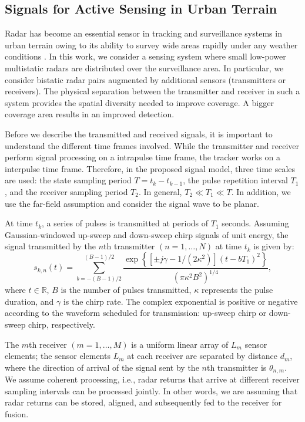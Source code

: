 \documentclass[times]{asjcauth}
\begin{document}
\subsection{Signals for Active Sensing in Urban Terrain}
\label{secsensor}

Radar has become an essential sensor in tracking and surveillance systems in urban terrain owing to its ability to survey wide areas rapidly under any weather conditions \cite{chavali}. In this work, we consider a sensing system where small low-power multistatic radars are distributed over the surveillance area. In particular, we consider bistatic radar pairs augmented by additional sensors (transmitters or receivers). The physical separation between the transmitter and receiver in such a system provides the spatial diversity needed to improve coverage. A bigger coverage area results in an improved detection.

Before we describe the transmitted and received signals, it is important to understand the different time frames involved. While the transmitter and receiver perform signal processing on a intrapulse time frame, the tracker works on a interpulse time frame. Therefore, in the proposed signal model, three time scales are used:  the state sampling period $T = t_{k}-t_{k-1}$, the pulse repetition interval $T_{1}$, and the receiver sampling period $T_{2}$. In general, $T_{2}\ll T_{1}\ll T$. In addition,  we use the far-field assumption and consider the signal wave to be planar.

At time $t_{k}$, a series of pulses is transmitted at periods of $T_{1}$ seconds. Assuming Gaussian-windowed up-sweep and down-sweep chirp signals of unit energy, the signal transmitted by the $n$th transmitter $(n = 1,\ldots,N)$ at time $t_{k}$ is given by:
\begin{equation}\label{txsignal}
s_{k,n}(t) = \sum_{b =
-(B-1)/2}^{(B-1)/2}\frac{\exp\left\{\left[\pm j\gamma -
1/(2\kappa^{2})\right]\left(t-bT_{1}\right)^{2}\right\}}{\left(\pi\kappa^{2}B^{2}\right)^{1/4}},
\end{equation}
\noindent where $t\in\mathbb{R}$, $B$ is the number of pulses transmitted, $\kappa$ represents the pulse duration, and $\gamma$ is the chirp rate. The complex exponential is positive or negative according to the waveform scheduled for transmission: up-sweep chirp or down-sweep chirp, respectively.

The $m$th receiver $(m = 1,\ldots,M)$ is a uniform linear array of $L_{m}$ sensor elements; the sensor elements $L_{m}$ at each receiver are separated by distance $d_{m}$, where the direction of arrival of the signal sent by the $n$th transmitter is $\theta_{n,m}$. We assume coherent processing, i.e., radar returns that arrive at different receiver sampling intervals can be processed jointly. In other words, we are assuming that radar returns can be stored, aligned, and subsequently fed to the receiver for fusion.
\end{document}
